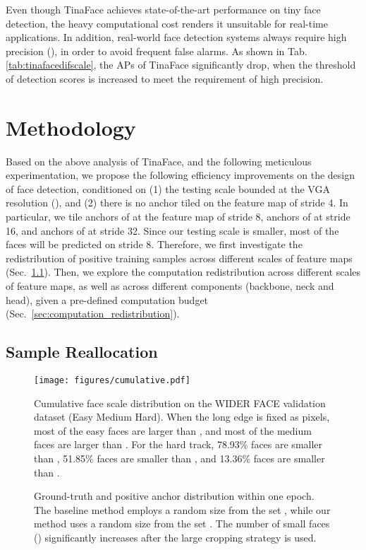\documentclass[10pt,twocolumn,letterpaper]{article}
\begin{document}
Even though TinaFace achieves state-of-the-art performance on tiny face detection, the heavy computational cost renders it unsuitable for real-time applications. In addition, real-world face detection systems always require high precision (\eg ), in order to avoid frequent false alarms. As shown in Tab. \ref{tab:tinafacedifscale}, the APs of TinaFace significantly drop, when the threshold of detection scores is increased to meet the requirement of high precision. 

\section{Methodology}

Based on the above analysis of TinaFace, and the following meticulous experimentation, we propose the following efficiency improvements on the design of face detection, conditioned on (1) the testing scale bounded at the VGA resolution (), and (2) there is no anchor tiled on the feature map of stride 4. In particular, we tile anchors of  at the feature map of stride 8, anchors of  at stride 16, and anchors of  at stride 32. Since our testing scale is smaller, most of the faces will be predicted on stride 8. Therefore, we first investigate the redistribution of positive training samples across different scales of feature maps (Sec.~\ref{sec:sample_reallocation}). Then, we explore the computation redistribution across different scales of feature maps, as well as across different components (\ie backbone, neck and head), given a pre-defined computation budget (Sec.~\ref{sec:computation_redistribution}).

\subsection{Sample Reallocation}
\label{sec:sample_reallocation}
\begin{figure}[t!]
\centering
\texttt{[image: figures/cumulative.pdf]}
\caption{Cumulative face scale distribution on the WIDER FACE validation dataset (Easy  Medium  Hard). When the long edge is fixed as  pixels, most of the easy faces are larger than , and most of the medium faces are larger than . For the hard track, 78.93\% faces are smaller than , 51.85\% faces are smaller than , and 13.36\% faces are smaller than .}
\vspace{-4mm}
\label{fig:cumulativewiderval}
\end{figure}

\begin{figure}[t!]
\centering
{}
\caption{Ground-truth and positive anchor distribution within one epoch. The baseline method employs a random size from the set , while our method uses a random size from the set . The number of small faces () significantly increases after the large cropping strategy is used.}
\vspace{-4mm}
\label{fig:samplereallocation}
\end{figure}
\end{document}
